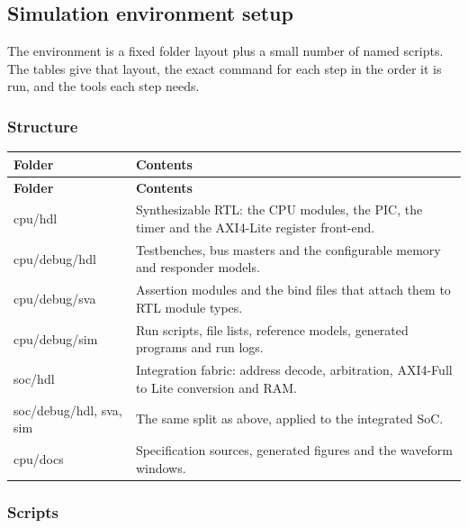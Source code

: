 \documentclass[11pt]{article}
\begin{document}
\subsection{Simulation environment setup}
\noindent The environment is a fixed folder layout plus a small number of named scripts. The tables give that layout, the exact command for each step in the order it is run, and the tools each step needs.\par\medskip
{}\subsubsection{Structure}
{\small
\begin{longtable}{@{}L{0.2200\dimexpr\linewidth-12pt\relax}L{0.7800\dimexpr\linewidth-12pt\relax}@{}}
\toprule
\textbf{Folder} & \textbf{Contents} \\ \midrule
\endfirsthead
\toprule
\textbf{Folder} & \textbf{Contents} \\ \midrule
\endhead
cpu/hdl & Synthesizable RTL: the CPU modules, the PIC, the timer and the AXI4-Lite register front-end. \\ \addlinespace[3pt]
cpu/debug/hdl & Testbenches, bus masters and the configurable memory and responder models. \\ \addlinespace[3pt]
cpu/debug/sva & Assertion modules and the bind files that attach them to RTL module types. \\ \addlinespace[3pt]
cpu/debug/sim & Run scripts, file lists, reference models, generated programs and run logs. \\ \addlinespace[3pt]
soc/hdl & Integration fabric: address decode, arbitration, AXI4-Full to Lite conversion and RAM. \\ \addlinespace[3pt]
soc/debug/hdl, sva, sim & The same split as above, applied to the integrated SoC. \\ \addlinespace[3pt]
cpu/docs & Specification sources, generated figures and the waveform windows. \\*
\bottomrule\end{longtable}}
\subsubsection{Scripts}
\end{document}
